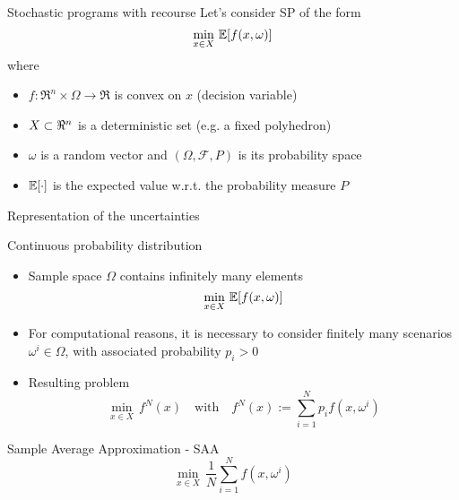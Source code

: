 \begin{frame}{Stochastic programs with recourse}
Let's consider SP of the form
\[
\min_{x \in X}\, \mathbb{E}[f(x,\omega)]
\]
where
\begin{itemize}
\item $f:\Re^n\times \Omega \to \Re$ is convex on $x$ (decision variable)
\item $X \subset \Re^n$ is a deterministic set (e.g. a fixed polyhedron)
\item $\omega$ is a random vector and $(\Omega,\mathcal{F},P)$ is its probability space
\item $\mathbb{E}[\cdot]$ is the expected value w.r.t. the probability measure $P$
\end{itemize}
\end{frame}


\begin{frame}{Representation of the uncertainties}
\begin{block}{Continuous probability distribution}
\begin{itemize}
\item Sample space  $\Omega$ contains infinitely many elements
\[
\min_{x \in X}\, \mathbb{E}[f(x,\omega)]
\]

\item  For computational reasons, it is necessary to  consider finitely many scenarios $\omega^i \in \Omega$, with associated probability $p_i>0$
\pula

\item Resulting problem
\[
\min_{x \in X}\, f^N(x)\quad \mbox{with}\quad f^N(x):=\sum_{i=1}^{N}p_if(x,\omega^i)
\]
\end{itemize}
\end{block}
\begin{block}{Sample Average Approximation - SAA}
\[
\min_{x \in X}\, \frac{1}{N}\sum_{i=1}^{N}f(x,\omega^i)
\]
\end{block}
 \end{frame}






